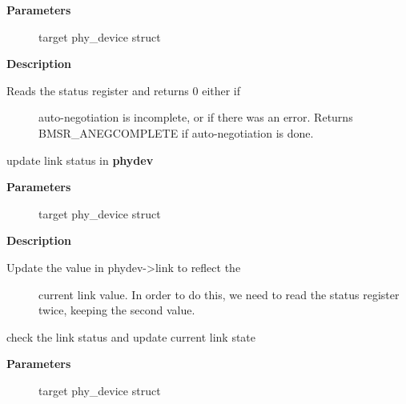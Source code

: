 \documentclass[a4paper,8pt,english]{sphinxmanual}
\begin{document}
\textbf{Parameters}
\begin{description}
\item[{}] \leavevmode
target phy\_device struct

\end{description}

\textbf{Description}
\begin{description}
\item[{Reads the status register and returns 0 either if}] \leavevmode
auto-negotiation is incomplete, or if there was an error.
Returns BMSR\_ANEGCOMPLETE if auto-negotiation is done.

\end{description}

\begin{fulllineitems}
\label{networking/kapi:c.genphy_update_link}
update link status in \textbf{phydev}

\end{fulllineitems}


\textbf{Parameters}
\begin{description}
\item[{}] \leavevmode
target phy\_device struct

\end{description}

\textbf{Description}
\begin{description}
\item[{Update the value in phydev-\textgreater{}link to reflect the}] \leavevmode
current link value.  In order to do this, we need to read
the status register twice, keeping the second value.

\end{description}

\begin{fulllineitems}
\label{networking/kapi:c.genphy_read_status}
check the link status and update current link state

\end{fulllineitems}


\textbf{Parameters}
\begin{description}
\item[{}] \leavevmode
target phy\_device struct

\end{description}
\end{document}
